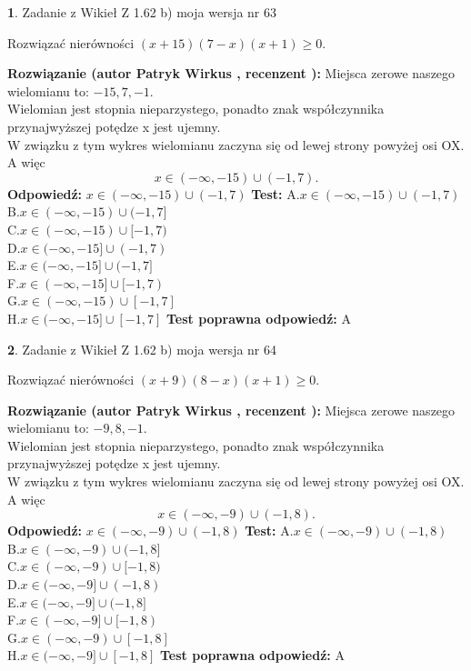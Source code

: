 \documentclass[12pt, a4paper]{article}
\theoremstyle{definition} %
\newtheorem{zad}{}
\newcommand{\zadStart}[1]{\begin{zad}#1\newline}
\newcommand{\zadStop}{\end{zad}}
\newcommand{\rozwStart}[2]{\noindent \textbf{Rozwiązanie (autor #1 , recenzent #2): }\newline}
\newcommand{\rozwStop}{\newline}
\newcommand{\odpStart}{\noindent \textbf{Odpowiedź:}\newline}
\newcommand{\odpStop}{\newline}
\newcommand{\testStart}{\noindent \textbf{Test:}\newline}
\newcommand{\testStop}{\newline}
\newcommand{\kluczStart}{\noindent \textbf{Test poprawna odpowiedź:}\newline}
\newcommand{\kluczStop}{\newline}
\begin{document}
\zadStart{Zadanie z Wikieł Z 1.62 b) moja wersja nr 63}

Rozwiązać nierówności $(x+15)(7-x)(x+1)\ge0$.
\zadStop
\rozwStart{Patryk Wirkus}{}
Miejsca zerowe naszego wielomianu to: $-15, 7, -1$.\\
Wielomian jest stopnia nieparzystego, ponadto znak współczynnika przy\linebreak najwyższej potędze x jest ujemny.\\ W związku z tym wykres wielomianu zaczyna się od lewej strony powyżej osi OX. A więc $$x \in (-\infty,-15) \cup (-1,7).$$
\rozwStop
\odpStart
$x \in (-\infty,-15) \cup (-1,7)$
\odpStop
\testStart
A.$x \in (-\infty,-15) \cup (-1,7)$\\
B.$x \in (-\infty,-15) \cup (-1,7]$\\
C.$x \in (-\infty,-15) \cup [-1,7)$\\
D.$x \in (-\infty,-15] \cup (-1,7)$\\
E.$x \in (-\infty,-15] \cup (-1,7]$\\
F.$x \in (-\infty,-15] \cup [-1,7)$\\
G.$x \in (-\infty,-15) \cup [-1,7]$\\
H.$x \in (-\infty,-15] \cup [-1,7]$
\testStop
\kluczStart
A
\kluczStop



\zadStart{Zadanie z Wikieł Z 1.62 b) moja wersja nr 64}

Rozwiązać nierówności $(x+9)(8-x)(x+1)\ge0$.
\zadStop
\rozwStart{Patryk Wirkus}{}
Miejsca zerowe naszego wielomianu to: $-9, 8, -1$.\\
Wielomian jest stopnia nieparzystego, ponadto znak współczynnika przy\linebreak najwyższej potędze x jest ujemny.\\ W związku z tym wykres wielomianu zaczyna się od lewej strony powyżej osi OX. A więc $$x \in (-\infty,-9) \cup (-1,8).$$
\rozwStop
\odpStart
$x \in (-\infty,-9) \cup (-1,8)$
\odpStop
\testStart
A.$x \in (-\infty,-9) \cup (-1,8)$\\
B.$x \in (-\infty,-9) \cup (-1,8]$\\
C.$x \in (-\infty,-9) \cup [-1,8)$\\
D.$x \in (-\infty,-9] \cup (-1,8)$\\
E.$x \in (-\infty,-9] \cup (-1,8]$\\
F.$x \in (-\infty,-9] \cup [-1,8)$\\
G.$x \in (-\infty,-9) \cup [-1,8]$\\
H.$x \in (-\infty,-9] \cup [-1,8]$
\testStop
\kluczStart
A
\kluczStop
\end{document}
